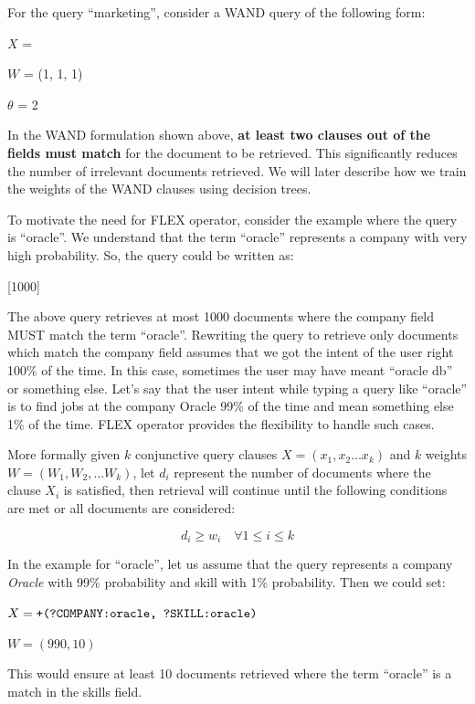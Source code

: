 For the query ``marketing'', consider a WAND query of the following form:

$X$ = 

$W$ = (1, 1, 1)

$\theta$ = 2


In the WAND formulation shown above, {\bf at least
two clauses out of the fields must match} for the document to be retrieved. This
significantly reduces the number of irrelevant documents retrieved.
We will later describe how we train the weights of the WAND clauses using
decision trees. 

To motivate the need for FLEX operator, consider the example where the query is
``oracle''. We understand that the term ``oracle'' represents a company with
very high probability. So, the query could be written as:

[1000]

The above query retrieves at most 1000 documents where the company field MUST
match the term ``oracle''. Rewriting the query to retrieve only documents which
match the company field assumes that we got the intent of the user right 100\%
of the time. In this case, sometimes the user may have meant ``oracle db'' or
something else. Let's say that the user intent while typing a query like
``oracle'' is to find jobs at the company Oracle 99\% of the time and mean
something else 1\% of the time. FLEX operator provides the flexibility to handle
such cases. 

More formally given $k$ conjunctive query clauses $X = (x_1, x_2 \ldots x_k)$ and
$k$ weights $W = (W_1, W_2, \ldots W_k)$, let $d_i$ represent the number of
documents where the clause $X_i$ is satisfied, then retrieval will continue
until the following conditions are met or all documents are considered:

\begin{equation} \label{eqn:flex}
    d_i \geq w_i \quad \forall 1 \leq i \leq k
\end{equation}

In the example for ``oracle'', let us assume that the query represents a
company {\it Oracle} with 99\% probability and skill with 1\% probability.
Then we could set:

$X = \lucenequery{+(?COMPANY:oracle, ?SKILL:oracle)}$

$W = (990, 10)$ 

This
would ensure at least 10 documents retrieved where the term ``oracle'' is a
match in the skills field.

